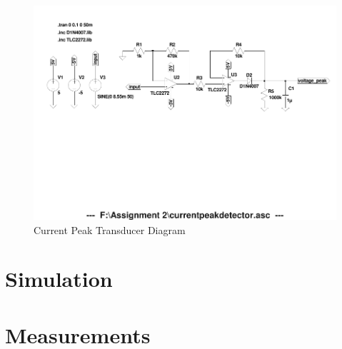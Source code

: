 \begin{figure}[h!]
    \centering
    \includegraphics[width = 0.65\linewidth]{Figures/currentpeakdetector.pdf}
        \caption{Current Peak Transducer Diagram}
    \label{fig:currentpeakdetector.pdf}
\end{figure}

\section{Simulation} \label{sec:simulation_switchmode}

\section{Measurements} \label{sec:measurements_switchmode}








